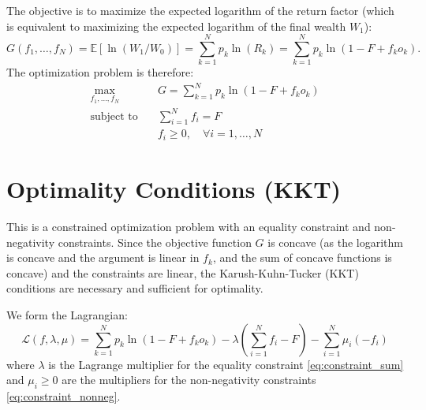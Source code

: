 \documentclass[11pt, letterpaper]{article}
\theoremstyle{definition}
\newcommand{\E}{\mathbb{E}} %
\begin{document}
The objective is to maximize the expected logarithm of the return factor (which is equivalent to maximizing the expected logarithm of the final wealth $W_1$):
\begin{equation}
    G(f_1, \dots, f_N) = \E[\ln(W_1/W_0)] = \sum_{k=1}^N p_k \ln(R_k) = \sum_{k=1}^N p_k \ln(1 - F + f_k o_k).
    \label{eq:objective}
\end{equation}
The optimization problem is therefore:
\begin{align}
    \max_{f_1, \dots, f_N} \quad & G = \sum_{k=1}^N p_k \ln(1 - F + f_k o_k) \\
    \text{subject to} \quad & \sum_{i=1}^N f_i = F \label{eq:constraint_sum} \\
                        & f_i \ge 0, \quad \forall i=1, \dots, N \label{eq:constraint_nonneg}
\end{align}

\section{Optimality Conditions (KKT)}
\label{sec:kkt}

This is a constrained optimization problem with an equality constraint and non-negativity constraints. Since the objective function $G$ is concave (as the logarithm is concave and the argument is linear in $f_k$, and the sum of concave functions is concave) and the constraints are linear, the Karush-Kuhn-Tucker (KKT) conditions are necessary and sufficient for optimality.

We form the Lagrangian:
\begin{equation}
    \mathcal{L}(f, \lambda, \mu) = \sum_{k=1}^N p_k \ln(1 - F + f_k o_k) - \lambda \left( \sum_{i=1}^N f_i - F \right) - \sum_{i=1}^N \mu_i (-f_i)
\end{equation}
where $\lambda$ is the Lagrange multiplier for the equality constraint \eqref{eq:constraint_sum} and $\mu_i \ge 0$ are the multipliers for the non-negativity constraints \eqref{eq:constraint_nonneg}.
\end{document}
